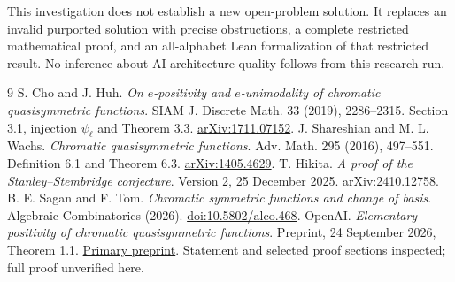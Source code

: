 \documentclass[11pt,a4paper]{article}
\theoremstyle{definition}
\begin{document}
This investigation does not establish a new open-problem solution. It
replaces an invalid purported solution with precise obstructions, a complete
restricted mathematical proof, and an all-alphabet Lean formalization of that restricted result.
No inference about AI architecture quality follows from this research run.

\begin{thebibliography}{9}
 S. Cho and J. Huh.
\emph{On $e$-positivity and $e$-unimodality of chromatic quasisymmetric functions}.
SIAM J. Discrete Math. 33 (2019), 2286--2315.
Section 3.1, injection $\psi_\ell$ and Theorem 3.3.
\href{https://arxiv.org/abs/1711.07152}{arXiv:1711.07152}.
 J. Shareshian and M. L. Wachs.
\emph{Chromatic quasisymmetric functions}.
Adv. Math. 295 (2016), 497--551. Definition 6.1 and Theorem 6.3.
\href{https://arxiv.org/abs/1405.4629}{arXiv:1405.4629}.
 T. Hikita.
\emph{A proof of the Stanley--Stembridge conjecture}.
Version 2, 25 December 2025.
\href{https://arxiv.org/abs/2410.12758}{arXiv:2410.12758}.
 B. E. Sagan and F. Tom.
\emph{Chromatic symmetric functions and change of basis}.
Algebraic Combinatorics (2026).
\href{https://doi.org/10.5802/alco.468}{doi:10.5802/alco.468}.
 OpenAI.
\emph{Elementary positivity of chromatic quasisymmetric functions}.
Preprint, 24 September 2026, Theorem 1.1.
\href{https://github.com/openai/math/blob/main/preprints/Elementary-Positivity-of-Chromatic-Quasisymmetric-Functions-September-24-2026/paper.pdf}{Primary preprint}.
Statement and selected proof sections inspected; full proof unverified here.
\end{thebibliography}
\end{document}
